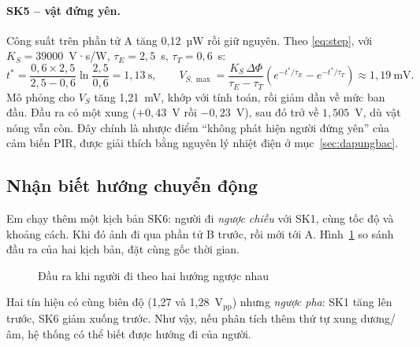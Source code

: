 \paragraph{SK5 -- vật đứng yên.} Công suất trên phần tử A tăng 0,12~µW rồi giữ nguyên. Theo \eqref{eq:step}, với $K_S = \num{39000}$~V·s/W, $\tau_E = 2{,}5$~s, $\tau_T = 0{,}6$~s:
\begin{equation*}
  t^* = \frac{0{,}6\times2{,}5}{2{,}5-0{,}6}\ln\frac{2{,}5}{0{,}6} = 1{,}13~\text{s},\qquad
  V_{S,\max} = \frac{K_S\,\Delta\Phi}{\tau_E-\tau_T}\left(e^{-t^*/\tau_E}-e^{-t^*/\tau_T}\right) \approx 1{,}19~\text{mV}.
\end{equation*}
Mô phỏng cho $V_S$ tăng 1,21~mV, khớp với tính toán, rồi giảm dần về mức ban đầu. Đầu ra có một xung ($+0{,}43$~V rồi $-0{,}23$~V), sau đó trở về $1{,}505$~V, dù vật nóng vẫn còn. Đây chính là nhược điểm ``không phát hiện người đứng yên'' của cảm biến PIR, được giải thích bằng nguyên lý nhiệt điện ở mục~\ref{sec:dapungbac}.

\subsection{Nhận biết hướng chuyển động}
\label{sec:kq-huong}

Em chạy thêm một kịch bản SK6: người đi \emph{ngược chiều} với SK1, cùng tốc độ và khoảng cách. Khi đó ảnh đi qua phần tử B trước, rồi mới tới A. Hình~\ref{fig:huong} so sánh đầu ra của hai kịch bản, đặt cùng gốc thời gian.

\begin{figure}[!htb]
\centering
{}
\caption{Đầu ra khi người đi theo hai hướng ngược nhau}
\label{fig:huong}
\end{figure}

Hai tín hiệu có cùng biên độ (1,27 và 1,28~V$_\text{pp}$) nhưng \emph{ngược pha}: SK1 tăng lên trước, SK6 giảm xuống trước. Như vậy, nếu phân tích thêm thứ tự xung dương/âm, hệ thống có thể biết được hướng đi của người.

